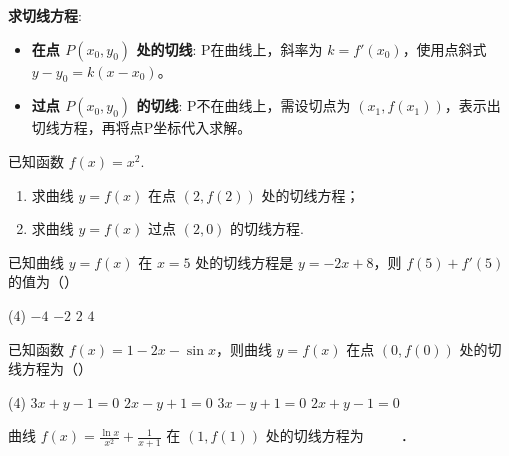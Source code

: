 \begin{theorem}
    \textbf{求切线方程}:
    \begin{itemize}
        \item \textbf{在点 $P(x_0, y_0)$ 处的切线}: P在曲线上，斜率为 $k=f'(x_0)$，使用点斜式 $y-y_0 = k(x-x_0)$。
        \item \textbf{过点 $P(x_0, y_0)$ 的切线}: P不在曲线上，需设切点为 $(x_1, f(x_1))$，表示出切线方程，再将点P坐标代入求解。
    \end{itemize}
\end{theorem}
\begin{example}
    已知函数 $f(x) = x^{2}$.
    \begin{enumerate}
        \item[(1)] 求曲线 $y = f(x)$ 在点 $(2,f(2))$ 处的切线方程；
        \item[(2)] 求曲线 $y = f(x)$ 过点 $(2,0)$ 的切线方程.
    \end{enumerate}
\end{example}

\vspace{4em}

\begin{example}
    已知曲线 $y = f(x)$ 在 $x = 5$ 处的切线方程是 $y = - 2x + 8$，则 $f(5) + f'(5)$ 的值为（\quad）
    \begin{tasks}(4)
        \task $- 4$ \task $- 2$ \task $2$ \task $4$
    \end{tasks}
\end{example}

\vspace{4em}

\begin{example}
    已知函数 $f(x) = 1 - 2x - \sin x$，则曲线 $y = f(x)$ 在点 $(0,f(0))$ 处的切线方程为（\quad）
    \begin{tasks}(4)
        \task $3x + y - 1 = 0$
        \task $2x - y + 1 = 0$
        \task $3x - y + 1 = 0$
        \task $2x + y - 1 = 0$
    \end{tasks}
\end{example}

\vspace{4em}

\begin{example}
    曲线 $f(x)=\frac{\ln x}{x^2}+\frac{1}{x+1}$ 在 $(1, f(1))$ 处的切线方程为
    \underline{$\qquad$} ．
\end{example}

\vspace{4em}

